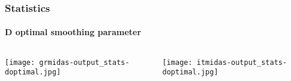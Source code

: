 \begin{frame}
 \frametitle{Statistics}
 \framesubtitle{D optimal smoothing parameter}
 \label{ch4:}
   
  \begin{columns}
    \begin{column}{0.5\textwidth}
      \texttt{[image: grmidas-output\_stats-doptimal.jpg]}   
    \end{column}
    \begin{column}{0.5\textwidth}
    \begin{center}
      \texttt{[image: itmidas-output\_stats-doptimal.jpg]}     
    \end{center}
    \end{column}
  
  \end{columns}

\end{frame}
\note{}


